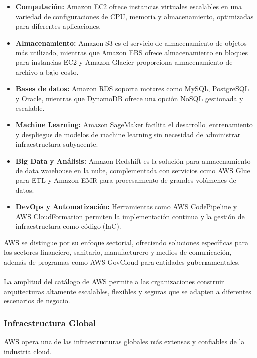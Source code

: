 {                \begin{itemize}
                    \item \textbf{Computación:} Amazon EC2 ofrece instancias virtuales escalables en una variedad de configuraciones de CPU, memoria y almacenamiento, optimizadas para diferentes aplicaciones.
                    \item \textbf{Almacenamiento:} Amazon S3 es el servicio de almacenamiento de objetos más utilizado, mientras que Amazon EBS ofrece almacenamiento en bloques para instancias EC2 y Amazon Glacier proporciona almacenamiento de archivo a bajo costo.
                    \item \textbf{Bases de datos:} Amazon RDS soporta motores como MySQL, PostgreSQL y Oracle, mientras que DynamoDB ofrece una opción NoSQL gestionada y escalable.
                    \item \textbf{Machine Learning:} Amazon SageMaker facilita el desarrollo, entrenamiento y despliegue de modelos de machine learning sin necesidad de administrar infraestructura subyacente.
                    \item \textbf{Big Data y Análisis:} Amazon Redshift es la solución para almacenamiento de data warehouse en la nube, complementada con servicios como AWS Glue para ETL y Amazon EMR para procesamiento de grandes volúmenes de datos.
                    \item \textbf{DevOps y Automatización:} Herramientas como AWS CodePipeline y AWS CloudFormation permiten la implementación continua y la gestión de infraestructura como código (IaC).
                \end{itemize}
                
                AWS se distingue por su enfoque sectorial, ofreciendo soluciones específicas para los sectores financiero, sanitario, manufacturero y medios de comunicación, además de programas como AWS GovCloud para entidades gubernamentales.
                
                \paragraph{} La amplitud del catálogo de AWS permite a las organizaciones construir arquitecturas altamente escalables, flexibles y seguras que se adapten a diferentes escenarios de negocio.
                
            \subsubsection{Infraestructura Global}
                AWS opera una de las infraestructuras globales más extensas y confiables de la industria cloud.
                
}
